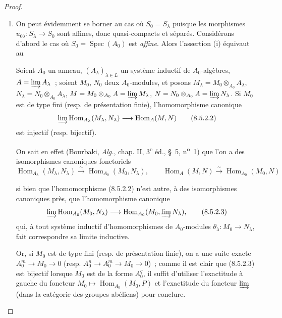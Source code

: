 \begin{proof}
\begin{enumerate}[label=(\roman*)]
  \item On peut évidemment se borner au cas où $S_0=S_\lambda$ puisque les
  morphismes $u_{0\lambda}:S_\lambda\to S_0$ sont affines, donc quasi-compacts
  et séparés. Considérons d'abord le cas où
  $S_0=\operatorname{Spec}(A_0)$ est \emph{affine}. Alors l'assertion (i)
  équivaut au

  \begin{lemma}[8.5.2.1]
  \label{IV.8.5.2.1-fr}
  Soient $A_0$ un anneau, $(A_\lambda)_{\lambda\in L}$ un système inductif de
  $A_0$-algèbres, $A=\varinjlim A_\lambda$~; soient $M_0$, $N_0$ deux
  $A_0$-modules, et posons
  $M_\lambda=M_0\otimes_{A_0}A_\lambda$,
  $N_\lambda=N_0\otimes_{A_0}A_\lambda$,
  $M=M_0\otimes_{A_0}A=\varinjlim M_\lambda$,
  $N=N_0\otimes_{A_0}A=\varinjlim N_\lambda$. Si $M_0$ est de type fini
  (resp. de présentation finie), l'homomorphisme canonique
  \begin{equation}
    \varinjlim\operatorname{Hom}_{A_\lambda}(M_\lambda,N_\lambda)
    \longrightarrow\operatorname{Hom}_A(M,N)
    \tag{8.5.2.2}\label{IV.8.5.2.2-fr}
  \end{equation}
  est injectif (resp. bijectif).
  \end{lemma}

  On sait en effet (Bourbaki, \emph{Alg.}, chap. II, 3\textsuperscript{e} éd.,
  \S~5, n\textsuperscript{o}~1) que l'on a des isomorphismes canoniques
  fonctoriels
  \[
    \operatorname{Hom}_{A_\lambda}(M_\lambda,N_\lambda)
    \xrightarrow{\sim}\operatorname{Hom}_{A_0}(M_0,N_\lambda),
    \qquad
    \operatorname{Hom}_A(M,N)
    \xrightarrow{\sim}\operatorname{Hom}_{A_0}(M_0,N)
  \]

  si bien que l'homomorphisme (8.5.2.2) n'est autre, à des isomorphismes
  canoniques près, que l'homomorphisme canonique
  \begin{equation}
    \varinjlim\operatorname{Hom}_{A_0}(M_0,N_\lambda)
    \longrightarrow
    \operatorname{Hom}_{A_0}(M_0,\varinjlim N_\lambda),
    \tag{8.5.2.3}\label{IV.8.5.2.3-fr}
  \end{equation}
  qui, à tout système inductif d'homomorphismes de $A_0$-modules
  $\theta_\lambda:M_0\to N_\lambda$, fait correspondre sa limite inductive.

  Or, si $M_0$ est de type fini (resp. de présentation finie), on a une suite
  exacte $A_0^m\to M_0\to0$ (resp. $A_0^n\to A_0^m\to M_0\to0$)~; comme il est
  clair que (8.5.2.3) est bijectif lorsque $M_0$ est de la forme $A_0^q$, il
  suffit d'utiliser l'exactitude à gauche du foncteur
  $M_0\mapsto\operatorname{Hom}_{A_0}(M_0,P)$ et l'exactitude du foncteur
  $\varinjlim$ (dans la catégorie des groupes abéliens) pour conclure.


\end{enumerate}
\end{proof}
